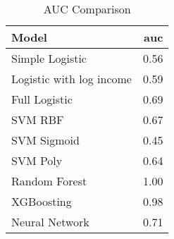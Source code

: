 \begin{table}
\caption{AUC Comparison}
\label{tab:auc_compare}
\begin{tabular}{lr}
\toprule
Model & auc \\
\midrule
Simple Logistic & 0.56 \\
Logistic with log income & 0.59 \\
Full Logistic & 0.69 \\
SVM RBF & 0.67 \\
SVM Sigmoid & 0.45 \\
SVM Poly & 0.64 \\
Random Forest & 1.00 \\
XGBoosting & 0.98 \\
Neural Network & 0.71 \\
\bottomrule
\end{tabular}
\end{table}
